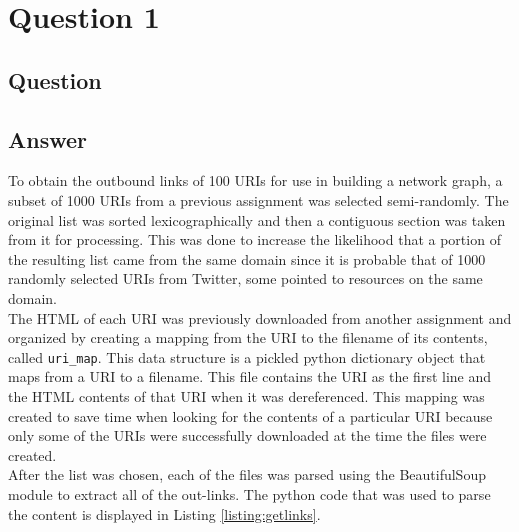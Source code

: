\section{Question 1}

\subsection{Question}


\subsection{Answer}
To obtain the outbound links of 100 URIs for use in building a network graph, a subset of 1000 URIs from a previous assignment was selected semi-randomly. The original list was sorted lexicographically and then a contiguous section was taken from it for processing. This was done to increase the likelihood that a portion of the resulting list came from the same domain since it is probable that of 1000 randomly selected URIs from Twitter, some pointed to resources on the same domain.\\

The HTML of each URI was previously downloaded from another assignment and organized by creating a mapping from the URI to the filename of its contents, called {\tt uri\_map}. This data structure is a pickled\cite{py:pickle} python dictionary object that maps from a URI to a filename. This file contains the URI as the first line and the HTML contents of that URI when it was dereferenced. This mapping was created to save time when looking for the contents of a particular URI because only some of the URIs were successfully downloaded at the time the files were created.\\

After the list was chosen, each of the files was parsed using the BeautifulSoup\cite{py:soup} module to extract all of the out-links. The python code that was used to parse the content is displayed in Listing \ref{listing:getlinks}.

\newpage
